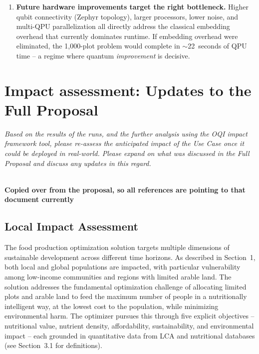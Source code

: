 \documentclass{oqireport}
\begin{document}
\begin{enumerate}
    \item \textbf{Future hardware improvements target the right bottleneck.} Higher qubit connectivity (Zephyr topology), larger processors, lower noise, and multi-QPU parallelization all directly address the classical embedding overhead that currently dominates runtime. If embedding overhead were eliminated, the 1,000-plot problem would complete in $\sim$22~seconds of QPU time -- a regime where quantum \textit{improvement} is decisive.
\end{enumerate}




\newpage


\section{Impact assessment: Updates to the Full Proposal}

\textit{
Based on the results of the runs, and the further analysis using the OQI impact framework tool, please re-assess the anticipated impact of the Use Case once it could be deployed in real-world. Please expand on what was discussed in the Full Proposal and discuss any updates in this regard.
}

\\
\textbf{Copied over from the proposal, so all references are pointing to that document currently}



\subsection{Local Impact Assessment}

The food production optimization solution targets multiple dimensions of sustainable development across different time horizons. As described in Section~1, both local and global populations are impacted, with particular vulnerability among low-income communities and regions with limited arable land. The solution addresses the fundamental optimization challenge of allocating limited plots and arable land to feed the maximum number of people in a nutritionally intelligent way, at the lowest cost to the population, while minimizing environmental harm. The optimizer pursues this through five explicit objectives -- nutritional value, nutrient density, affordability, sustainability, and environmental impact -- each grounded in quantitative data from LCA and nutritional databases (see Section~3.1 for definitions).
\end{document}
